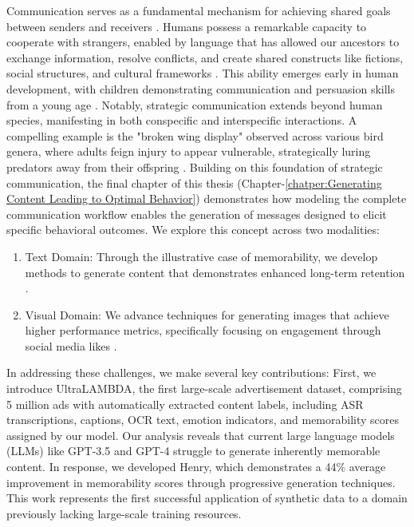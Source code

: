 Communication serves as a fundamental mechanism for achieving shared goals between senders and receivers \cite{smith2003animal}. Humans possess a remarkable capacity to cooperate with strangers, enabled by language that has allowed our ancestors to exchange information, resolve conflicts, and create shared constructs like fictions, social structures, and cultural frameworks \cite{misyak2016instantaneous,mccroskey2015introduction,smith1997major}. This ability emerges early in human development, with children demonstrating communication and persuasion skills from a young age \cite{perner1985john}. Notably, strategic communication extends beyond human species, manifesting in both conspecific \cite{hare2000chimpanzees,smith2003animal} and interspecific \cite{krebs1984animal,fouts200235} interactions. A compelling example is the "broken wing display" observed across various bird genera, where adults feign injury to appear vulnerable, strategically luring predators away from their offspring \cite{griffin2001animal}.
Building on this foundation of strategic communication, the final chapter of this thesis (Chapter-\ref{chatper:Generating Content Leading to Optimal Behavior}) demonstrates how modeling the complete communication workflow enables the generation of messages designed to elicit specific behavioral outcomes. We explore this concept across two modalities:

\begin{enumerate}
    \item Text Domain: Through the illustrative case of memorability, we develop methods to generate content that demonstrates enhanced long-term retention \cite{si2023long}.

    \item Visual Domain: We advance techniques for generating images that achieve higher performance metrics, specifically focusing on engagement through social media likes \cite{khurana2023behavior}.

\end{enumerate}


In addressing these challenges, we make several key contributions:
First, we introduce UltraLAMBDA, the first large-scale advertisement dataset, comprising 5 million ads with automatically extracted content labels, including ASR transcriptions, captions, OCR text, emotion indicators, and memorability scores assigned by our model. Our analysis reveals that current large language models (LLMs) like GPT-3.5 and GPT-4 struggle to generate inherently memorable content. In response, we developed Henry, which demonstrates a 44\% average improvement in memorability scores through progressive generation techniques. This work represents the first successful application of synthetic data to a domain previously lacking large-scale training resources.


